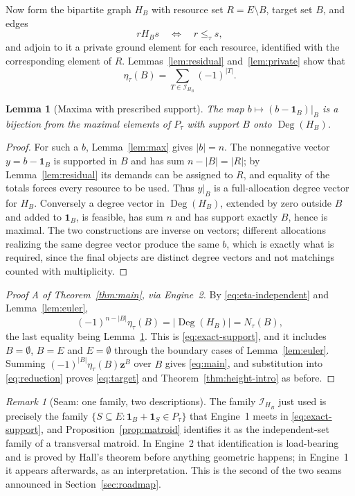 \documentclass[11pt]{article}
\numberwithin{equation}{section}
\newtheorem{lemma}[theorem]{Lemma}
\theoremstyle{definition}
\theoremstyle{remark}
\newtheorem{remark}[theorem]{Remark}
\newcommand{\one}{\mathbf 1}
\newcommand{\Deg}{\operatorname{Deg}}
\newcommand{\Ical}{\mathcal I}
\newcommand{\zt}[1]{\mathbf z^{#1}}
\begin{document}
Now form the bipartite graph $H_B$ with resource set $R=E\setminus B$, target
set $B$, and edges
\begin{equation}
 r\mathrel{H_B}s\quad\Longleftrightarrow\quad r\le_\tau s,
 \label{eq:H-S}
\end{equation}
and adjoin to it a private ground element for each resource, identified with
the corresponding element of $R$. Lemmas~\ref{lem:residual}
and~\ref{lem:private} show that
\begin{equation}
 \eta_\tau(B)=\sum_{T\in\Ical_{H_B}}(-1)^{|T|}.
 \label{eq:eta-independent}
\end{equation}

\begin{lemma}[Maxima with prescribed support]
\label{lem:max-degrees}
The map $b\mapsto(b-\one_B)|_B$ is a bijection from the maximal elements of
$P_\tau$ with support $B$ onto $\Deg(H_B)$.
\end{lemma}

\begin{proof}
For such a $b$, Lemma~\ref{lem:max} gives $|b|=n$. The nonnegative vector
$y=b-\one_B$ is supported in $B$ and has sum $n-|B|=|R|$; by
Lemma~\ref{lem:residual} its demands can be assigned to $R$, and equality of
the totals forces every resource to be used. Thus $y|_B$ is a full-allocation
degree vector for $H_B$. Conversely a degree vector in $\Deg(H_B)$, extended
by zero outside $B$ and added to $\one_B$, is feasible, has sum $n$ and has
support exactly $B$, hence is maximal. The two constructions are inverse on
vectors; different allocations realizing the same degree vector produce the
same $b$, which is exactly what is required, since the final objects are
distinct degree vectors and not matchings counted with multiplicity.
\end{proof}

\begin{proof}[Proof A of Theorem~\ref{thm:main}, via Engine~2]
By \eqref{eq:eta-independent} and Lemma~\ref{lem:euler},
\[
 (-1)^{n-|B|}\eta_\tau(B)=|\Deg(H_B)|=N_\tau(B),
\]
the last equality being Lemma~\ref{lem:max-degrees}. This is
\eqref{eq:exact-support}, and it includes $B=\emptyset$, $B=E$ and
$E=\emptyset$ through the boundary cases of Lemma~\ref{lem:euler}. Summing
$(-1)^{|B|}\eta_\tau(B)\zt B$ over $B$ gives \eqref{eq:main}, and substitution
into \eqref{eq:reduction} proves \eqref{eq:target} and
Theorem~\ref{thm:height-intro} as before.
\end{proof}

\begin{remark}[Seam: one family, two descriptions]
\label{rem:seam-matroid}
The family $\Ical_{H_B}$ just used is precisely the family
$\{S\subseteq E:\one_B+\one_S\in P_\tau\}$ that Engine~1 meets in
\eqref{eq:exact-support}, and Proposition~\ref{prop:matroid} identifies it as
the independent-set family of a transversal matroid. In Engine~2 that
identification is load-bearing and is proved by Hall's theorem before
anything geometric happens; in Engine~1 it appears afterwards, as an
interpretation. This is the second of the two seams announced in
Section~\ref{sec:roadmap}.
\end{remark}
\end{document}
